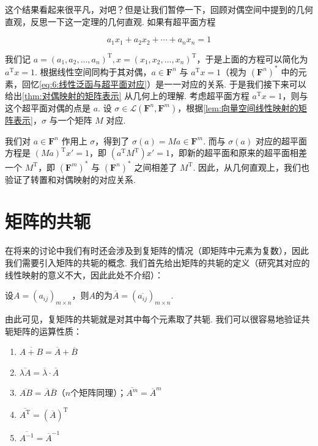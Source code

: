 这个结果看起来很平凡，对吧？但是让我们暂停一下，回顾对偶空间中提到的几何直观，反思一下这一定理的几何直观. 如果有超平面方程

\[
    a_1 x_1 + a_2 x_2 + \cdots + a_n x_n = 1
\]

我们记 $a = (a_1,a_2,\ldots,a_n)^\mathrm{T}, x = (x_1,x_2,\ldots,x_n)^\mathrm{T}$，于是上面的方程可以简化为 $a^\mathrm{T} x = 1$. 根据线性空间同构于其对偶，$a \in \mathbf{F}^n$ 与 $a^\mathrm{T} x = 1$（视为 $(\mathbf{F}^n)^*$ 中的元素，回忆\autoref{eq:6:线性泛函与超平面对应}）是一一对应的关系. 于是我们接下来可以给出\autoref{thm:对偶映射的矩阵表示} 从几何上的理解. 考虑超平面方程 $a^\mathrm{T} x = 1$，则与这个超平面对偶的点是 $a$. 设 $\sigma \in \mathcal{L}(\mathbf{F}^n,\mathbf{F}^m)$，根据\autoref{lem:向量空间线性映射的矩阵表示}，$\sigma$ 与一个矩阵 $M$ 对应.

我们对 $a \in \mathbf{F}^n$ 作用上 $\sigma$，得到了 $\sigma(a) = Ma \in \mathbf{F}^m$. 而与 $\sigma(a)$ 对应的超平面方程是 $(Ma)^\mathrm{T} x' = 1$，即 $(a^\mathrm{T}M^\mathrm{T}) x' = 1$，即新的超平面和原来的超平面相差一个 $M^\mathrm{T}$，即 $(\mathbf{F}^m)^*$ 与 $(\mathbf{F}^n)^*$ 之间相差了 $M^\mathrm{T}$. 因此，从几何直观上，我们也验证了转置和对偶映射的对应关系.

\section{矩阵的共轭}

在将来的讨论中我们有时还会涉及到复矩阵的情况（即矩阵中元素为复数），因此我们需要引入矩阵的共轭的概念. 我们首先给出矩阵的共轭的定义（研究其对应的线性映射的意义不大，因此此处不介绍）：
\begin{definition}{}{}
    设$A=(a_{ij})_{m \times n}$，则$A$的为$\overline{A}=(\overline{a_{ij}})_{m \times n}$.
\end{definition}

由此可见，复矩阵的共轭就是对其中每个元素取了共轭. 我们可以很容易地验证共轭矩阵的运算性质：
\begin{enumerate}
    \item $\overline{A+B}=\overline{A}+\overline{B}$

    \item $\overline{\lambda A}=\overline{\lambda} \cdot \overline{A}$

    \item $\overline{AB}=\overline{A}\overline{B}$（$n$个矩阵同理）；$\overline{A^m}=\overline{A}^m$

    \item $\overline{A^\mathrm{T}}=(\overline{A})^\mathrm{T}$

    \item $\overline{A^{-1}}=\overline{A}^{-1}$
\end{enumerate}

